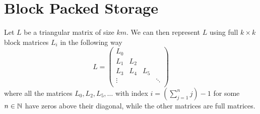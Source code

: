 \section{Block Packed Storage}\label{sec: memory layout}

Let \(L\) be a triangular matrix of size \(km\). We can then represent
\(L\) using full \(k\times k\) block matrices \(L_i\) in the following way
\[
	L = \begin{pmatrix}
		L_0 & \\
		L_1 & L_2 \\
		L_3 & L_4 & L_5 \\
		\vdots & & & \ddots \\
	\end{pmatrix}
\]
where all the matrices \(L_0,L_2,L_5,\dots\) with index \(i=(\sum_{j=1}^nj) -
1\) for some \(n\in\mathbb{N}\) have zeros above their diagonal, while the other
matrices are full matrices.